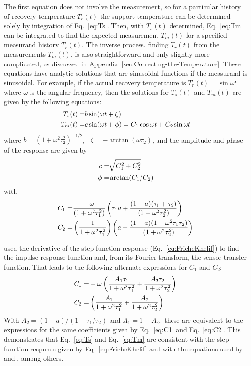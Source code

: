 \documentclass[amt, manuscript]{copernicus}
\begin{document}
The first equation does not involve the measurement, so for a particular
history of recovery temperature \(T_{r}(t)\) the support temperature can
be determined solely by integration of Eq.~\eqref{eq:Ts}. Then, with
\(T_{s}(t)\) determined, Eq.~\eqref{eq:Tm} can be integrated to find the
expected measurement \(T_{m}(t)\) for a specified measurand history
\(T_{r}(t)\). The inverse process, finding \(T_{r}(t)\) from the
measurements \(T_{m}(t)\), is also straightforward and only slightly
more complicated, as discussed in
Appendix~\ref{sec:Correcting-the-Temperature}. These equations have
analytic solutions that are sinusoidal functions if the measurand is
sinusoidal. For example, if the actual recovery temperature is
\(T_{r}(t)=\sin\omega t\) where \(\omega\) is the angular frequency,
then the solutions for \(T_{s}(t)\) and \(T_{m}(t)\) are given by the
following equations: \begin{align}
T_{s}(t)= & b\sin(\omega t+\zeta){\label{eq:TsSolved}} \\
T_{m}(t)= & c\sin(\omega t+\phi)=C_{1}\cos\omega t+C_{2}\sin\omega t{\label{eq:TmSolved}}
\end{align} where \(b=(1+\omega^2\tau_2^2)^{-1/2}\),
~\(\zeta=-\arctan(\omega\tau_2)\), and the amplitude and phase of the
response are given by \begin{align}
c= & \sqrt{C_{1}^{2}+C_{2}^{2}}{\label{eq:responseAmp}} \\
\phi= & \arctan(C_{1}/C_{2}){\label{eq:responsePhase}}
\end{align} with \begin{align}
C_{1}= & \frac{-\omega}{(1+\omega^{2}\tau_{1}^{2})}\left(\tau_{1}a+\frac{(1-a)(\tau_{1}+\tau_{2})}{(1+\omega^{2}\tau_{2}^{2})}\right){\label{eq:C1}} \\
C_{2}= & \left(\frac{1}{1+\omega^{2}\tau_{1}^{2}}\right)\left(a+\frac{(1-a)(1-\omega^{2}\tau_{1}\tau_{2})}{(1+\omega^{2}\tau_{2}^{2})}\right){\label{eq:C2}}
\end{align}

\citet{mccarthy1973method} used the derivative of the step-function
response (Eq.~\eqref{eq:FrieheKhelif}) to find the impulse response
function and, from its Fourier transform, the sensor transfer function.
That leads to the following alternate expressions for \(C_{1}\) and
\(C_{2}\): \begin{align}
C_{1}= & -\omega\left(\frac{A_{1}\tau_{1}}{1+\omega^{2}\tau_{1}^{2}}+\frac{A_{2}\tau_{2}}{1+\omega^{2}\tau_{2}^{2}}\right){\label{eq:C1M}} \\
C_{2}= & \left(\frac{A_{1}}{1+\omega^{2}\tau_{1}^{2}}+\frac{A_{2}}{1+\omega^{2}\tau_{2}^{2}}\right){\label{eq:C2M}}
\end{align} With \(A_{2}=(1-a)/(1-\tau_{1}/\tau_{2})\) and
\(A_{1}=1-A_{2},\) these are equivalent to the expressions for the same
coefficients given by Eq.~\eqref{eq:C1} and Eq.~\eqref{eq:C2}. This
demonstrates that Eq.~\eqref{eq:Ts} and Eq.~\eqref{eq:Tm} are consistent
with the step-function response given by Eq.~\eqref{eq:FrieheKhelif} and
with the equations used by \citet{mccarthy1973method} and
\citet{InverarityJTech2000}, among others.
\end{document}
